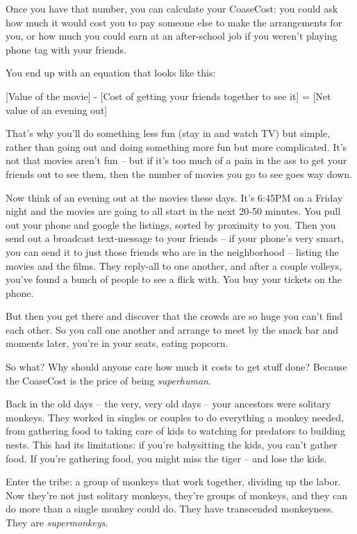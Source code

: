 Once you have that number, you can calculate your CoaseCost: you
could ask how much it would cost you to pay someone else to make
the arrangements for you, or how much you could earn at an
after-school job if you weren't playing phone tag with your
friends.

You end up with an equation that looks like this:

[Value of the movie] - [Cost of getting your friends together to
see it] = [Net value of an evening out]

That's why you'll do something less fun (stay in and watch TV) but
simple, rather than going out and doing something more fun but more
complicated. It's not that movies aren't fun -- but if it's too
much of a pain in the ass to get your friends out to see them, then
the number of movies you go to see goes way down.

Now think of an evening out at the movies these days. It's 6:45PM
on a Friday night and the movies are going to all start in the next
20-50 minutes. You pull out your phone and google the listings,
sorted by proximity to you. Then you send out a broadcast
text-message to your friends -- if your phone's very smart, you can
send it to just those friends who are in the neighborhood --
listing the movies and the films. They reply-all to one another,
and after a couple volleys, you've found a bunch of people to see a
flick with. You buy your tickets on the phone.

But then you get there and discover that the crowds are so huge you
can't find each other. So you call one another and arrange to meet
by the snack bar and moments later, you're in your seats, eating
popcorn.

So what? Why should anyone care how much it costs to get stuff
done? Because the CoaseCost is the price of being
\emph{superhuman}.

Back in the old days -- the very, very old days -- your ancestors
were solitary monkeys. They worked in singles or couples to do
everything a monkey needed, from gathering food to taking care of
kids to watching for predators to building nests. This had its
limitations: if you're babysitting the kids, you can't gather food.
If you're gathering food, you might miss the tiger -- and lose the
kids.

Enter the tribe: a group of monkeys that work together, dividing up
the labor. Now they're not just solitary monkeys, they're groups of
monkeys, and they can do more than a single monkey could do. They
have transcended monkeyness. They are \emph{supermonkeys}.

